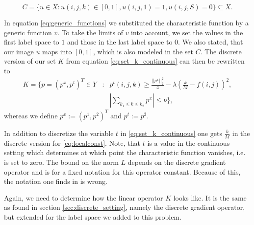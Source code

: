         \begin{equation}
            C = \{ u \in X: u(i,j,k) \in [0,1], u(i, j, 1) = 1, u(i, j, S) = 0 \} \subseteq X.
        \end{equation}

    In equation \ref{eq:generic_functions} we substituted the characteristic function by a generic function $v$. To take the limits of $v$ into account, we set the values in the first label space to $1$ and those in the last label space to $0$. We also stated, that our image $u$ maps into $[0, 1]$, which is also modeled in the set $C$.
    The discrete version of our set $K$ from equation \ref{eq:set_k_continuous} can then be rewritten to
        \begin{eqnarray}
            K = \{ p = (p^{x}, p^{t})^{T} \in Y &:& p^{t}(i,j,k) \ge \frac{||p^{x}||_{2}^{2}}{4} - \lambda(\frac{k}{M} - f(i,j))^{2}, \label{eq:local_constraint} \\
            &&\left| \sum_{k_{1} \le k \le k_{2}} p^{x} \right| \le \nu \}, \label{eq:non_local_constraint}
        \end{eqnarray}
    whereas we define $p^{x} := (p^{1}, p^{2})^{T}$ and $p^{t} := p^{3}$.

    \begin{remark}
        In addition to discretize the variable $t$ in \ref{eq:set_k_continuous} one gets $\frac{k}{M}$ in the discrete version for \ref{eq:localconst}. Note, that $t$ is a value in the continuous setting which determines at which point the characteristic function vanishes, i.e. is set to zero. The bound on the norm $L$ depends on the discrete gradient operator and is for a fixed notation for this operator constant. Because of this, the notation one finds in \cite{Pock-et-al-iccv09} is wrong.
    \end{remark}

    Again, we need to determine how the linear operator $K$ looks like. It is the same as found in section \ref{sec:discrete_setting}, namely the discrete gradient operator, but extended for the label space we added to this problem.

